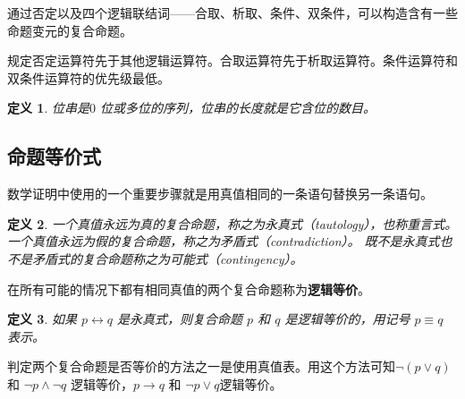 \documentclass{ctexart}
\newtheorem{definition}{\indent 定义}[section]
\begin{document}
通过否定以及四个逻辑联结词——合取、析取、条件、双条件，可以构造含有一些命题变元的复合命题。

规定否定运算符先于其他逻辑运算符。合取运算符先于析取运算符。条件运算符和双条件运算符的优先级最低。

\begin{definition}
    位串是$0$ 位或多位的序列，位串的长度就是它含位的数目。
\end{definition}
\subsection{命题等价式}
数学证明中使用的一个重要步骤就是用真值相同的一条语句替换另一条语句。
\begin{definition}
    一个真值永远为真的复合命题，称之为永真式（tautology），也称重言式。
    一个真值永远为假的复合命题，称之为矛盾式（contradiction）。
    既不是永真式也不是矛盾式的复合命题称之为可能式（contingency）。
\end{definition}
在所有可能的情况下都有相同真值的两个复合命题称为\textbf{逻辑等价}。
\begin{definition}
    如果 $p \leftrightarrow q$ 是永真式，则复合命题 $p$ 和 $q$ 是逻辑等价的，用记号 $p \equiv q$ 表示。
\end{definition}
判定两个复合命题是否等价的方法之一是使用真值表。用这个方法可知$\lnot (p \lor q)$ 和 $\lnot p \land \lnot q$ 逻辑等价，$p \rightarrow q$ 和 $ \lnot p \lor q$逻辑等价。
\end{document}
